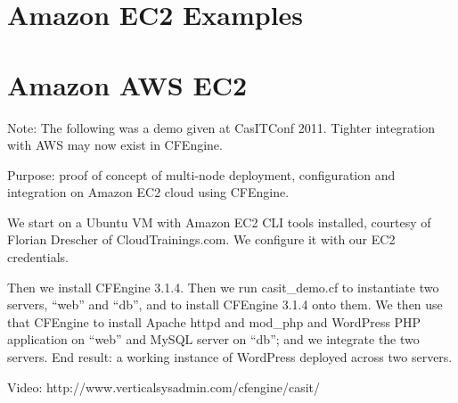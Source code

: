 \section{Amazon EC2 Examples}





\section{Amazon AWS EC2}

Note: The following was a demo given at CasITConf 2011. Tighter integration with AWS may now exist in CFEngine.

Purpose: proof of concept of multi-node deployment, configuration and integration on Amazon EC2 cloud using CFEngine.

We start on a Ubuntu VM with Amazon EC2 CLI tools installed, courtesy of Florian Drescher of CloudTrainings.com. We configure it with our EC2 credentials.

Then we install CFEngine 3.1.4. Then we run casit\_demo.cf to instantiate two servers, ``web'' and ``db'', and to install CFEngine 3.1.4 onto them. We then use that CFEngine to install Apache httpd and mod\_php and WordPress PHP application on ``web'' and MySQL server on ``db''; and we integrate the two servers. End result: a working instance of WordPress deployed across two servers.

Video: http://www.verticalsysadmin.com/cfengine/casit/

